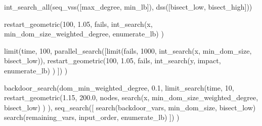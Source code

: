 \documentclass[a4paper]{article}
\newcommand{\vblabel}[1]	{\large\textbf{#1}}
\begin{document}
\begin{Zinc}[label=%
{\vblabel{Search on All Variables with Multiple Variable/Domain Orderings}}]
int_search_all(seq_vss([max_degree, min_lb]), dss([bisect_low, bisect_high]))
\end{Zinc}

\begin{Zinc}[label={\vblabel{Geometrically Restarting Search}}]
restart_geometric(100, 1.05, fails,
    int_search(x, min_dom_size_weighted_degree, enumerate_lb)
)
\end{Zinc}

\begin{Zinc}[label={\vblabel{Search with Nested Limits}}]
limit(time, 100,
    parallel_search([limit(fails, 1000,
        int_search(x, min_dom_size, bisect_low)),
        restart_geometric(100, 1.05, fails,
            int_search(y, impact, enumerate_lb)
        )
    ])
)
\end{Zinc}

\begin{Zinc}[label={\vblabel{Backdoor Search Example}}]
backdoor_search(dom_min_weighted_degree, 0.1,
    limit_search(time, 10,
        restart_geometric(1.15, 200.0, nodes,
            search(x, min_dom_size_weighted_degree, bisect_low)
        )
    ),
    seq_search([
        search(backdoor_vars, min_dom_size, bisect_low)
        search(remaining_vars, input_order, enumerate_lb)
    ])
)
\end{Zinc}
\end{document}
